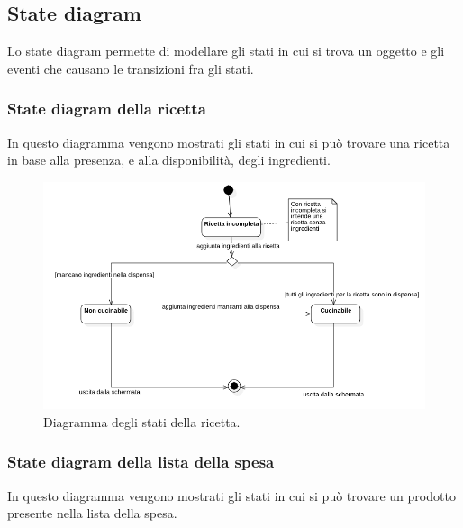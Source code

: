 \documentclass{article}
\begin{document}
\subsection{State diagram}

Lo state diagram permette di modellare gli stati in cui si trova un oggetto e gli eventi che causano le transizioni fra gli stati. 

\subsubsection{State diagram della ricetta}

In questo diagramma vengono mostrati gli stati in cui si può trovare una ricetta in base alla presenza, e alla disponibilità, degli ingredienti.

\begin{figure}[H]
    \includegraphics[width=\linewidth]{images/state-recipe.png}
    \caption{Diagramma degli stati della ricetta.}
    \label{fig:staterecipe}
\end{figure}

\subsubsection{State diagram della lista della spesa}

In questo diagramma vengono mostrati gli stati in cui si può trovare un prodotto presente nella lista della spesa.
\end{document}
